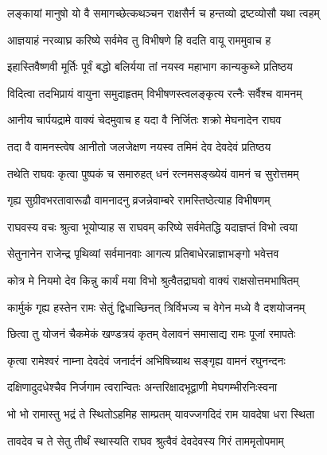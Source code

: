 \twolineshloka
{लङ्कायां मानुषो यो वै समागच्छेत्कथञ्चन}
{राक्षसैर्न च हन्तव्यो द्रष्टव्योसौ यथा त्वहम्}%


\twolineshloka
{आज्ञयाहं नरव्याघ्र करिष्ये सर्वमेव तु}
{विभीषणे हि वदति वायू राममुवाच ह}%

\twolineshloka
{इहास्तिवैष्णवी मूर्तिः पूर्वं बद्धो बलिर्यया}
{तां नयस्व महाभाग कान्यकुब्जे प्रतिष्ठय}%

\twolineshloka
{विदित्वा तदभिप्रायं वायुना समुदाहृतम्}
{विभीषणस्त्वलङ्कृत्य रत्नैः सर्वैश्च वामनम्}%

\twolineshloka
{आनीय चार्पयद्रामे वाक्यं चेदमुवाच ह}
{यदा वै निर्जितः शक्रो मेघनादेन राघव}%

\twolineshloka
{तदा वै वामनस्त्वेष आनीतो जलजेक्षण}
{नयस्व तमिमं देव देवदेवं प्रतिष्ठय}%

\twolineshloka
{तथेति राघवः कृत्वा पुष्पकं च समारुहत्}
{धनं रत्नमसङ्ख्येयं वामनं च सुरोत्तमम्}%

\twolineshloka
{गृह्य सुग्रीवभरतावारूढौ वामनादनु}
{व्रजन्नेवाम्बरे रामस्तिष्ठेत्याह विभीषणम्}%

\twolineshloka
{राघवस्य वचः श्रुत्वा भूयोप्याह स राघवम्}
{करिष्ये सर्वमेतद्धि यदाज्ञप्तं विभो त्वया}%

\twolineshloka
{सेतुनानेन राजेन्द्र पृथिव्यां सर्वमानवाः}
{आगत्य प्रतिबाधेरन्नाज्ञाभङ्गो भवेत्तव}%

\twolineshloka
{कोत्र मे नियमो देव किन्नु कार्यं मया विभो}
{श्रुत्वैतद्राघवो वाक्यं राक्षसोत्तमभाषितम्}%

\twolineshloka
{कार्मुकं गृह्य हस्तेन रामः सेतुं द्विधाच्छिनत्}
{त्रिर्विभज्य च वेगेन मध्ये वै दशयोजनम्}%

\twolineshloka
{छित्वा तु योजनं चैकमेकं खण्डत्रयं कृतम्}
{वेलावनं समासाद्य रामः पूजां रमापतेः}%

\twolineshloka
{कृत्वा रामेश्वरं नाम्ना देवदेवं जनार्दनं}
{अभिषिच्याथ सङ्गृह्य वामनं रघुनन्दनः}%

\twolineshloka
{दक्षिणादुदधेश्चैव निर्जगाम त्वरान्वितः}
{अन्तरिक्षादभूद्वाणी मेघगम्भीरनिःस्वना}%


\twolineshloka
{भो भो रामास्तु भद्रं ते स्थितोऽहमिह साम्प्रतम्}
{यावज्जगदिदं राम यावदेषा धरा स्थिता}%

\twolineshloka
{तावदेव च ते सेतु तीर्थं स्थास्यति राघव}
{श्रुत्वैवं देवदेवस्य गिरं ताममृतोपमाम्}%


